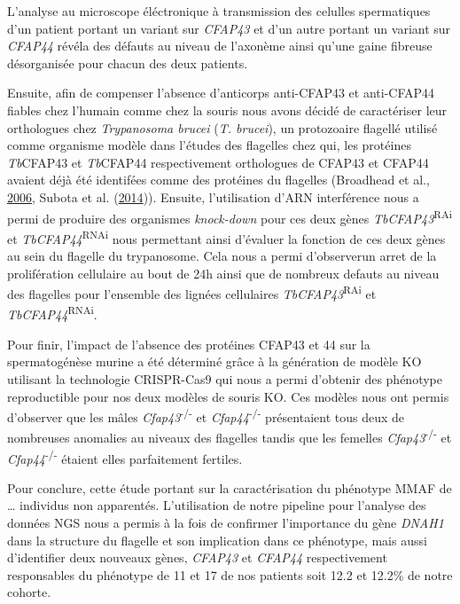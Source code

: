 \documentclass[12pt,twoside]{reedthesis}
\theoremstyle{definition}
\theoremstyle{definition}
\theoremstyle{remark}
\begin{document}
  L'analyse au microscope éléctronique à transmission des celulles
  spermatiques d'un patient portant un variant sur \emph{CFAP43} et d'un
  autre portant un variant sur \emph{CFAP44} révéla des défauts au niveau
  de l'axonème ainsi qu'une gaine fibreuse désorganisée pour chacun des
  deux patients.
  
  Ensuite, afin de compenser l'absence d'anticorps anti-CFAP43 et
  anti-CFAP44 fiables chez l'humain comme chez la souris nous avons décidé
  de caractériser leur orthologues chez \emph{Trypanosoma brucei}
  (\emph{T. brucei}), un protozoaire flagellé utilisé comme organisme
  modèle dans l'études des flagelles chez qui, les protéines
  \emph{Tb}CFAP43 et \emph{Tb}CFAP44 respectivement orthologues de CFAP43
  et CFAP44 avaient déjà été identifées comme des protéines du flagelles
  (Broadhead et al., \protect\hyperlink{ref-Broadhead2006}{2006}, Subota
  et al. (\protect\hyperlink{ref-Subota2014}{2014})). Ensuite,
  l'utilisation d'ARN interférence nous a permi de produire des organismes
  \emph{knock-down} pour ces deux gènes
  \emph{TbCFAP43}\textsuperscript{RAi} et
  \emph{TbCFAP44}\textsuperscript{RNAi} nous permettant ainsi d'évaluer la
  fonction de ces deux gènes au sein du flagelle du trypanosome. Cela nous
  a permi d'observerun arret de la prolifération cellulaire au bout de 24h
  ainsi que de nombreux defauts au niveau des flagelles pour l'ensemble
  des lignées cellulaires \emph{TbCFAP43}\textsuperscript{RAi} et
  \emph{TbCFAP44}\textsuperscript{RNAi}.
  
  Pour finir, l'impact de l'absence des protéines CFAP43 et 44 sur la
  spermatogénèse murine a été déterminé grâce à la génération de modèle KO
  utilisant la technologie CRISPR-Cas9 qui nous a permi d'obtenir des
  phénotype reproductible pour nos deux modèles de souris KO. Ces modèles
  nous ont permis d'observer que les mâles
  \emph{Cfap43}\textsuperscript{-/-} et \emph{Cfap44}\textsuperscript{-/-}
  présentaient tous deux de nombreuses anomalies au niveaux des flagelles
  tandis que les femelles \emph{Cfap43}\textsuperscript{-/-} et
  \emph{Cfap44}\textsuperscript{-/-} étaient elles parfaitement fertiles.
  
  Pour conclure, cette étude portant sur la caractérisation du phénotype
  MMAF de \ldots{} individus non apparentés. L'utilisation de notre
  pipeline pour l'analyse des données NGS nous a permis à la fois de
  confirmer l'importance du gène \emph{DNAH1} dans la structure du
  flagelle et son implication dans ce phénotype, mais aussi d'identifier
  deux nouveaux gènes, \emph{CFAP43} et \emph{CFAP44} respectivement
  responsables du phénotype de 11 et 17 de nos patients soit 12.2 et
  12.2\% de notre cohorte.
  
\end{document}
